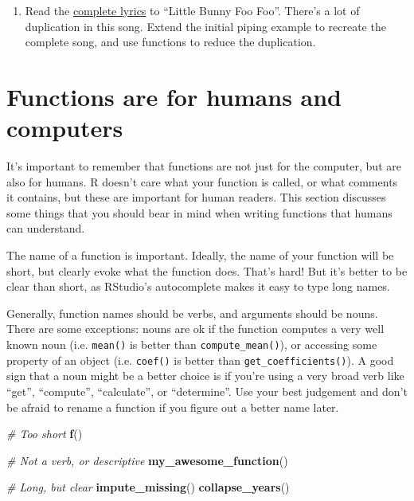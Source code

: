 \documentclass[]{book}
\newenvironment{Shaded}{\begin{snugshade}}{\end{snugshade}}
\newcommand{\KeywordTok}[1]{\textcolor[rgb]{0.13,0.29,0.53}{\textbf{{#1}}}}
\newcommand{\DecValTok}[1]{\textcolor[rgb]{0.00,0.00,0.81}{{#1}}}
\newcommand{\StringTok}[1]{\textcolor[rgb]{0.31,0.60,0.02}{{#1}}}
\newcommand{\CommentTok}[1]{\textcolor[rgb]{0.56,0.35,0.01}{\textit{{#1}}}}
\newcommand{\NormalTok}[1]{{#1}}
\begin{document}
\begin{enumerate}
\begin{Shaded}
\end{Shaded}
\item
  Read the
  \href{https://en.wikipedia.org/wiki/Little_Bunny_Foo_Foo}{complete
  lyrics} to ``Little Bunny Foo Foo''. There's a lot of duplication in
  this song. Extend the initial piping example to recreate the complete
  song, and use functions to reduce the duplication.
\end{enumerate}

\section{Functions are for humans and
computers}\label{functions-are-for-humans-and-computers}

It's important to remember that functions are not just for the computer,
but are also for humans. R doesn't care what your function is called, or
what comments it contains, but these are important for human readers.
This section discusses some things that you should bear in mind when
writing functions that humans can understand.

The name of a function is important. Ideally, the name of your function
will be short, but clearly evoke what the function does. That's hard!
But it's better to be clear than short, as RStudio's autocomplete makes
it easy to type long names.

Generally, function names should be verbs, and arguments should be
nouns. There are some exceptions: nouns are ok if the function computes
a very well known noun (i.e. \texttt{mean()} is better than
\texttt{compute\_mean()}), or accessing some property of an object (i.e.
\texttt{coef()} is better than \texttt{get\_coefficients()}). A good
sign that a noun might be a better choice is if you're using a very
broad verb like ``get'', ``compute'', ``calculate'', or ``determine''.
Use your best judgement and don't be afraid to rename a function if you
figure out a better name later.

\begin{Shaded}
\begin{Highlighting}[]
\CommentTok{# Too short}
\KeywordTok{f}\NormalTok{()}

\CommentTok{# Not a verb, or descriptive}
\KeywordTok{my_awesome_function}\NormalTok{()}

\CommentTok{# Long, but clear}
\KeywordTok{impute_missing}\NormalTok{()}
\KeywordTok{collapse_years}\NormalTok{()}
\end{Highlighting}
\end{Shaded}
\end{document}
